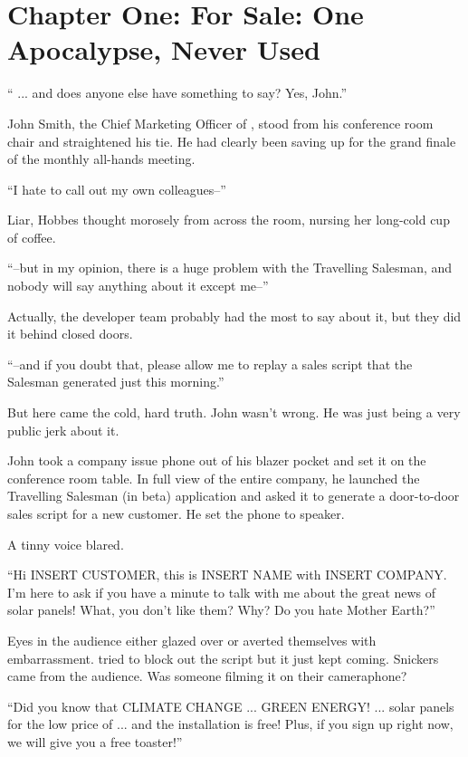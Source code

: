 \chapter{Chapter One: For Sale: One Apocalypse, Never Used}

`` ... and does anyone else have something to say? Yes, John.''

John Smith, the Chief Marketing Officer of \energyCompany{}, stood from his conference room chair and straightened his tie. He had clearly been saving up for the grand finale of the monthly all-hands meeting.

``I hate to call out my own colleagues--''

Liar, {\protag} Hobbes thought morosely from across the room, nursing her long-cold cup of coffee.

``--but in my opinion, there is a huge problem with the Travelling Salesman, and nobody will say anything about it except me--''

Actually, the developer team probably had the most to say about it, but they did it behind closed doors.

``--and if you doubt that, please allow me to replay a sales script that the Salesman generated just this morning.''

But here came the cold, hard truth. John wasn't wrong. He was just being a very public jerk about it.

John took a company issue phone out of his blazer pocket and set it on the conference room table. In full view of the entire company, he launched the Travelling Salesman (in beta) application and asked it to generate a door-to-door sales script for a new customer. He set the phone to speaker.

A tinny voice blared.

``Hi INSERT CUSTOMER, this is INSERT NAME with INSERT COMPANY. I'm here to ask if you have a minute to talk with me about the great news of solar panels! What, you don't like them? Why? Do you hate Mother Earth?''

Eyes in the audience either glazed over or averted themselves with embarrassment. {\protag} tried to block out the script but it just kept coming. Snickers came from the audience. Was someone filming it on their cameraphone?

``Did you know that CLIMATE CHANGE ... GREEN ENERGY! ... solar panels for the low price of ... and the installation is free! Plus, if you sign up right now, we will give you a free toaster!''

